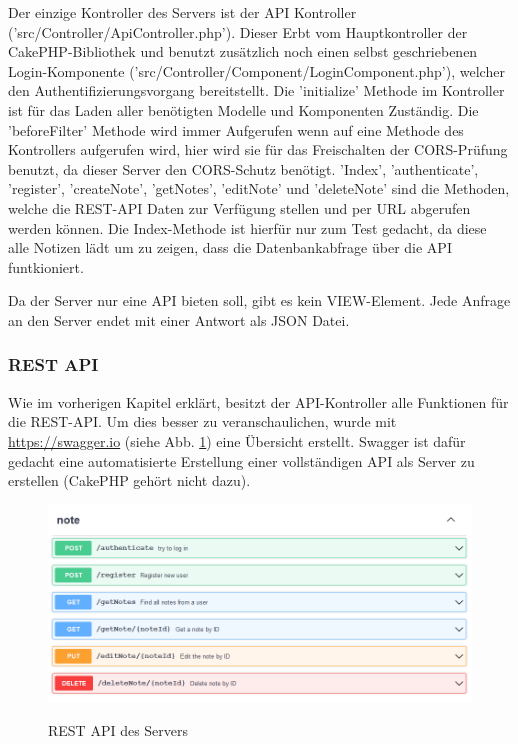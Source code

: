 \documentclass[12pt]{article}
\begin{document}
Der einzige Kontroller des Servers ist der API Kontroller ('src/Controller/ApiController.php'). Dieser Erbt vom Hauptkontroller der CakePHP-Bibliothek und benutzt zusätzlich noch einen selbst geschriebenen Login-Komponente ('src/Controller/Component/LoginComponent.php'), welcher den Authentifizierungsvorgang bereitstellt. Die 'initialize' Methode im Kontroller ist für das Laden aller benötigten Modelle und Komponenten Zuständig. Die 'beforeFilter' Methode wird immer Aufgerufen wenn auf eine Methode des Kontrollers aufgerufen wird, hier wird sie für das Freischalten der CORS-Prüfung benutzt, da dieser Server den CORS-Schutz benötigt. 'Index', 'authenticate', 'register', 'createNote', 'getNotes', 'editNote' und 'deleteNote' sind die Methoden, welche die REST-API Daten zur Verfügung stellen und per URL abgerufen werden können. Die Index-Methode ist hierfür nur zum Test gedacht, da diese alle Notizen lädt um zu zeigen, dass die Datenbankabfrage über die API funtkioniert.

Da der Server nur eine API bieten soll, gibt es kein VIEW-Element. Jede Anfrage an den Server endet mit einer Antwort als JSON Datei. 
            
            \subsubsection{REST API}
        
Wie im vorherigen Kapitel erklärt, besitzt der API-Kontroller alle Funktionen für die REST-API. Um dies besser zu veranschaulichen, wurde mit \url{https://swagger.io} (siehe Abb. \ref{fig:api}) eine Übersicht erstellt. Swagger ist dafür gedacht eine automatisierte Erstellung einer vollständigen API als Server zu erstellen (CakePHP gehört nicht dazu).
\begin{figure}[h!]
    \caption{REST API des Servers}
    \centering
    \includegraphics[width=1\textwidth]{api.png}
    \label{fig:api}
\end{figure}
\end{document}
